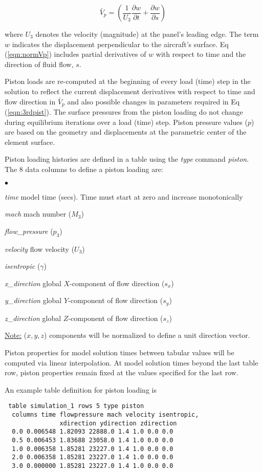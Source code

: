 \documentclass[11pt]{report}
\numberwithin{equation}{section}
\newcommand{\ul} {\underline}
\newcommand{\ti}{\emph}
\newcommand{\squishlist}{
 \begin{list}{$\bullet$}
  { \setlength{\itemsep}{0pt}
     \setlength{\parsep}{3pt}
     \setlength{\topsep}{3pt}
     \setlength{\partopsep}{0pt}
     \setlength{\leftmargin}{1.5em}
     \setlength{\labelwidth}{1em}
     \setlength{\labelsep}{0.5em} } }
\newcommand{\squishend}{
  \end{list}  }
\begin{document}
\begin{equation}\label{eqn:normVp}
 \bar V_p = \left( \dfrac{1}{U_3} \dfrac{\partial w}{\partial t}  + \dfrac{\partial w}{\partial s} \right) \, 
\end{equation}

\noindent where $U_3$ denotes the velocity (magnitude) at the panel's leading edge. 
The term $w$ indicates the displacement perpendicular  to the aircraft's 
surface. Eq (\ref{eqn:normVp}) includes partial derivatives of $w$ 
with respect to time and the direction of fluid flow, $s$. 

Piston loads are re-computed at the beginning of every load (time) step
in the solution to reflect the current displacement derivatives with respect to
time and flow direction in $\bar{V}_p$ and also possible changes in 
parameters required in
Eq (\ref{eqn:3rdpist}). The surface pressures from the piston loading 
do not change during equilibrium iterations over a load (time) step. 
Piston pressure values ($p$) are based on the geometry
and displacements at the parametric center of the element surface. 

Piston loading histories are defined in a table using the \ti{type} command 
\ti{piston}. The 8 data columns to define a piston loading are:
\squishlist
\item \ti{time} model time (secs). Time must start at zero and increase
monotonically
\item \ti{mach} mach number ($M_3$)
\item \ti{flow\_pressure}  ($p_3$)
\item \ti{velocity} flow velocity ($U_3$)
\item \ti{isentropic} ($\gamma$)
\item \ti{x\_direction} global $X$-component of flow direction ($s_x$)
\item \ti{y\_direction} global $Y$-component of flow direction ($s_y$)
\item \ti{z\_direction} global $Z$-component of flow direction ($s_z$)
\squishend
\ul{Note:} ($x,y,z$) components will be normalized to define a 
unit direction vector.

Piston properties for model solution times between tabular values will be
computed via linear interpolation. At model solution times beyond the last table row,
piston properties remain fixed at the values specified for the last row.

An example table definition for piston loading is 
\small
\begin{verbatim}
 table simulation_1 rows 5 type piston
  columns time flowpressure mach velocity isentropic,
               xdirection ydirection zdirection
  0.0 0.006548 1.82093 22888.0 1.4 1.0 0.0 0.0
  0.5 0.006453 1.83688 23058.0 1.4 1.0 0.0 0.0
  1.0 0.006358 1.85281 23227.0 1.4 1.0 0.0 0.0
  2.0 0.006358 1.85281 23227.0 1.4 1.0 0.0 0.0
  3.0 0.000000 1.85281 23227.0 1.4 1.0 0.0 0.0
\end{verbatim}
\normalsize
\end{document}
